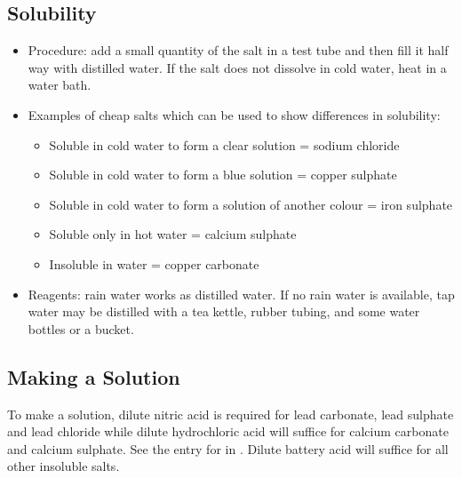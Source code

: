 \subsection{Solubility}
\begin{itemize}
\item{Procedure: add a small quantity of the salt in a test tube 
and then fill it half way with distilled water. 
If the salt does not dissolve in cold water, 
heat in a water bath.}
\item{Examples of cheap salts which can be used to show differences in solubility:}
\begin{itemize}
\item{Soluble in cold water to form a clear solution = sodium chloride}
\item{Soluble in cold water to form a blue solution = copper sulphate}
\item{Soluble in cold water to form a solution of another colour = iron sulphate}
\item{Soluble only in hot water = calcium sulphate} 
\item{Insoluble in water = copper carbonate}
\end{itemize}
\item{Reagents: rain water works as distilled water. 
If no rain water is available, 
tap water may be distilled with a tea kettle, 
rubber tubing, 
and some water bottles or a bucket.}
\end{itemize}

\subsection{Making a Solution}

To make a solution, 
dilute nitric acid is required for lead carbonate, 
lead sulphate and lead chloride 
while dilute hydrochloric acid will suffice 
for calcium carbonate and calcium sulphate. 
See the entry for  in . 
Dilute battery acid will suffice for all other insoluble salts. 

